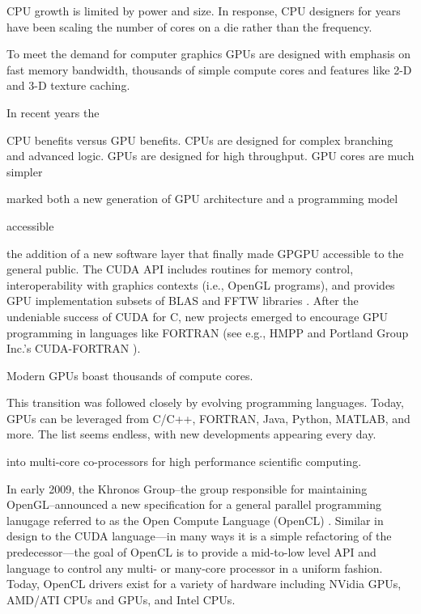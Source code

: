 \documentclass{report}
\begin{document}
CPU growth is limited by power and size. In response, CPU designers for years have been scaling the number of cores on a die rather than the frequency. 


To meet the demand for computer graphics GPUs are designed with emphasis on fast memory bandwidth, thousands of simple compute cores and features like 2-D and 3-D texture caching. 



In recent years the 

CPU benefits versus GPU benefits. CPUs are designed for complex branching and advanced logic. GPUs are designed for high throughput. GPU cores are much simpler 



 

marked both a 
new generation of GPU architecture and a programming model 

accessible 


the addition of a new software layer that finally made GPGPU accessible to the general public. The CUDA API includes routines for memory control, interoperability with graphics contexts (i.e., 
OpenGL programs), and provides GPU implementation subsets of BLAS and FFTW libraries \cite{CudaGuide2013}. After the undeniable success of CUDA for C, new projects emerged to encourage GPU programming in languages like FORTRAN (see e.g., HMPP \cite{HMPP2009} and Portland Group Inc.'s CUDA-FORTRAN \cite{CudaFortran2009}). 


Modern GPUs boast thousands of compute cores. 


This transition was 
followed closely by evolving programming languages. Today, GPUs can be leveraged from C/C++, FORTRAN, Java, Python, MATLAB, and more. The list seems endless, with new developments appearing every day. 

 into multi-core co-processors for high performance scientific computing.

In early 2009, the Khronos Group--the group responsible for maintaining OpenGL--announced a new specification for a general 
parallel programming lanugage referred to as the Open Compute Language (OpenCL) \cite{OpenCL2009}. Similar in design to the CUDA language---in many ways it is a simple refactoring of the predecessor---the goal of OpenCL is to provide a mid-to-low level API and language to control any multi- or many-core processor in a uniform fashion. Today, OpenCL drivers exist for a variety of hardware including NVidia GPUs, AMD/ATI CPUs and GPUs, and Intel CPUs. 
\end{document}
